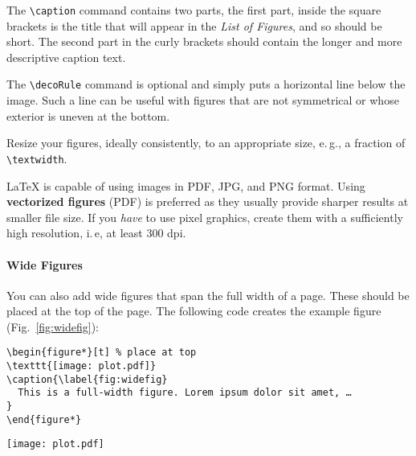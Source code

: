 The \verb|\caption| command contains two parts,%
the first part, inside the square brackets is the title that will appear in the \emph{List of Figures}, and so should be short.
 The second part in the curly brackets should contain the longer and more descriptive caption text.

The \verb|\decoRule| command is optional and simply puts a horizontal line below the image. Such a line can be useful with figures that are not symmetrical or whose exterior is uneven at the bottom.

Resize your figures, ideally consistently, to an appropriate size, e.\,g., a fraction of \texttt{\textbackslash textwidth}.

LaTeX is capable of using images in PDF, JPG, and PNG format. Using \textbf{vectorized figures} (PDF) is preferred as they usually provide sharper results at smaller file size. If you \emph{have} to use pixel graphics, create them with a sufficiently high resolution, i.\,e, at least 300 dpi.


\paragraph{Wide Figures} You can also add wide figures that span the full width of a page. These should be placed at the top of the page. The following code creates the example figure (Fig.~\ref{fig:widefig}):
\begin{lstlisting}[language={[LaTeX]TeX}]
\begin{figure*}[t] % place at top
\texttt{[image: plot.pdf]}
\caption{\label{fig:widefig}
  This is a full-width figure. Lorem ipsum dolor sit amet, …
}
\end{figure*}
\end{lstlisting}

\begin{figure*}[t]
\texttt{[image: plot.pdf]}
\caption{\label{fig:widefig}This is a full-width figure. Lorem ipsum dolor sit amet, consectetur adipisicing elit, sed do eiusmod tempor incididunt ut labore et dolore magna aliqua. Ut enim ad minim veniam, quis nostrud exercitation ullamco laboris nisi ut aliquip ex ea commodo consequat.}
\end{figure*}


